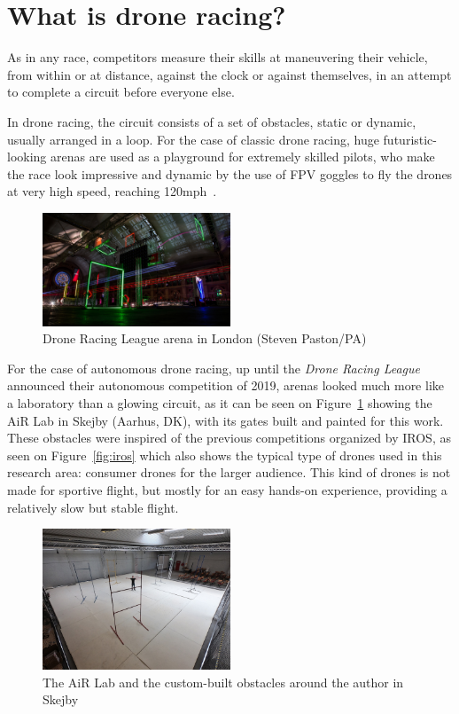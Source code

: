 \section{What is drone racing?}

As in any race, competitors measure their skills at maneuvering their vehicle,
from within or at distance, against the clock or against themselves, in an
attempt to complete a circuit before everyone else.

In drone racing, the circuit consists of a set of obstacles, static or
dynamic, usually arranged in a loop. For the case of classic drone racing, huge
futuristic-looking arenas are used as a playground for extremely skilled pilots,
who make the race look impressive and dynamic by the use of FPV goggles to fly
the drones at very high speed, reaching 120mph~\cite{DRL}.

\begin{figure}[h]
	\centering
	\includegraphics[width=0.5\textwidth]{figure/drl_arena.jpg}
	\caption{Drone Racing League arena in London (Steven
	Paston/PA)~\cite{DRLRecord}}
\end{figure}

For the case of autonomous drone racing, up until the \emph{Drone Racing
League} announced their autonomous competition of 2019, arenas looked much more
like a laboratory than a glowing circuit, as it can be seen on
Figure~\ref{fig:mygates} showing the AiR Lab in Skejby (Aarhus, DK), with its
gates built and painted for this work. These obstacles were inspired of the
previous competitions organized by IROS, as seen on Figure~\ref{fig:iros} which
also shows the typical type of drones used in this research area: consumer
drones for the larger audience. This kind of drones is not made for sportive
flight, but mostly for an easy hands-on experience, providing a relatively slow
but stable flight.

\begin{figure}[h]
	\centering
	\includegraphics[width=0.5\textwidth]{figure/tiny_me.jpg}
	\caption{The AiR Lab and the custom-built obstacles around the author in Skejby}
	\label{fig:mygates}
\end{figure}

